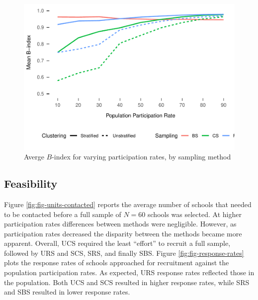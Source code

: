 \documentclass[man,floatsintext]{apa6}
\theoremstyle{definition}
\theoremstyle{definition}
\theoremstyle{definition}
\theoremstyle{remark}
\begin{document}
\begin{figure}
\centering
\includegraphics{GenSamp_Paper_files/figure-latex/fig-avg-Bindex-1.pdf}
\caption{\label{fig:fig-avg-Bindex}Averge \(B\)-index for varying
participation rates, by sampling method}
\end{figure}

\hypertarget{feasibility-1}{%
\subsection{Feasibility}\label{feasibility-1}}

Figure \ref{fig:fig-units-contacted} reports the average number of
schools that needed to be contacted before a full sample of \(N = 60\)
schools was selected. At higher participation rates differences between
methods were negligible. However, as participation rates decreased the
disparity between the methods became more apparent. Overall, UCS
required the least \enquote{effort} to recruit a full sample, followed
by URS and SCS, SRS, and finally SBS. Figure
\ref{fig:fig-response-rates} plots the response rates of schools
approached for recruitment against the population participation rates.
As expected, URS response rates reflected those in the population. Both
UCS and SCS resulted in higher response rates, while SRS and SBS
resulted in lower response rates.
\end{document}
